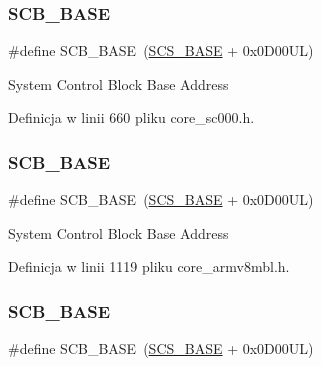 \subsubsection{\texorpdfstring{S\+C\+B\+\_\+\+B\+A\+SE}{SCB\_BASE}\hspace{0.1cm}{\footnotesize\ttfamily [4/12]}}
{\footnotesize\ttfamily \#define S\+C\+B\+\_\+\+B\+A\+SE~(\hyperlink{group___c_m_s_i_s__core__base_ga3c14ed93192c8d9143322bbf77ebf770}{S\+C\+S\+\_\+\+B\+A\+SE} +  0x0\+D00\+U\+L)}

System Control Block Base Address 

Definicja w linii 660 pliku core\+\_\+sc000.\+h.

\mbox{\label{group___c_m_s_i_s__core__base_gad55a7ddb8d4b2398b0c1cfec76c0d9fd}} 
\subsubsection{\texorpdfstring{S\+C\+B\+\_\+\+B\+A\+SE}{SCB\_BASE}\hspace{0.1cm}{\footnotesize\ttfamily [5/12]}}
{\footnotesize\ttfamily \#define S\+C\+B\+\_\+\+B\+A\+SE~(\hyperlink{group___c_m_s_i_s__core__base_ga3c14ed93192c8d9143322bbf77ebf770}{S\+C\+S\+\_\+\+B\+A\+SE} +  0x0\+D00\+U\+L)}

System Control Block Base Address 

Definicja w linii 1119 pliku core\+\_\+armv8mbl.\+h.

\mbox{\label{group___c_m_s_i_s__core__base_gad55a7ddb8d4b2398b0c1cfec76c0d9fd}} 
\subsubsection{\texorpdfstring{S\+C\+B\+\_\+\+B\+A\+SE}{SCB\_BASE}\hspace{0.1cm}{\footnotesize\ttfamily [6/12]}}
{\footnotesize\ttfamily \#define S\+C\+B\+\_\+\+B\+A\+SE~(\hyperlink{group___c_m_s_i_s__core__base_ga3c14ed93192c8d9143322bbf77ebf770}{S\+C\+S\+\_\+\+B\+A\+SE} +  0x0\+D00\+U\+L)}

